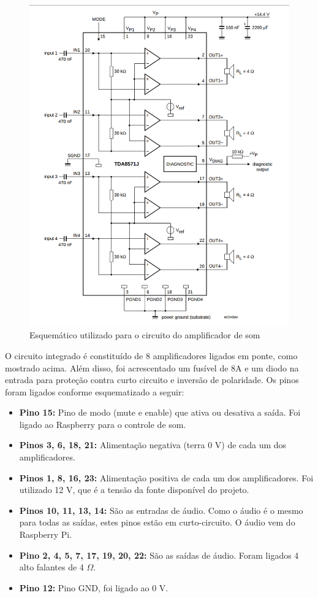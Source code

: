 \begin{figure}[H]
	\centering
    \includegraphics[width=\textwidth]{figuras/circuito_TDA}
    \caption{Esquemático utilizado para o circuito do amplificador de som}
    \label{fig:circuito_TDA}
\end{figure}

O circuito integrado é constituído de 8 amplificadores ligados em ponte, como mostrado acima. Além disso, foi acrescentado um fusível de 8A e um diodo na entrada para proteção contra curto circuito e inversão de polaridade. Os pinos foram ligados conforme esquematizado a seguir:

\begin{itemize}
	\item \textbf{Pino 15:} Pino de modo (mute e enable) que ativa ou desativa a saída. Foi ligado ao Raspberry para o controle de som.
    \item \textbf{Pinos 3, 6, 18, 21:} Alimentação negativa (terra 0 V) de cada um dos amplificadores.
    \item \textbf{Pinos 1, 8, 16, 23:} Alimentação positiva de cada um dos amplificadores. Foi utilizado 12 V, que é a tensão da fonte disponível do projeto.
    \item \textbf{Pinos 10, 11, 13, 14:} São as entradas de áudio. Como o áudio é o mesmo para todas as saídas, estes pinos estão em curto-circuito. O áudio vem do Raspberry Pi.
    \item \textbf{Pino 2, 4, 5, 7, 17, 19, 20, 22:} São as saídas de áudio. Foram ligados 4 alto falantes de 4 $\Omega$.
    \item \textbf{Pino 12:} Pino GND, foi ligado ao 0 V.
\end{itemize}

